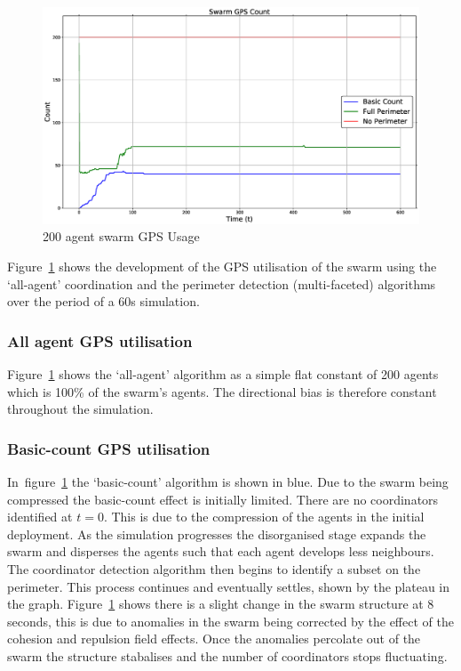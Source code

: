 \begin{figure}[H]
\begin{center}
\includegraphics[width=14cm]{CHAPTER-6/figures/SwarmPerimeter1}
\end{center}
\caption{200 agent swarm GPS Usage\label{fig:SwarmPerimeter1}}
\end{figure}

Figure~\ref{fig:SwarmPerimeter1} shows the development of the GPS utilisation of the swarm using the `all-agent' coordination and the perimeter detection (multi-faceted) algorithms over the period of a 60s simulation. 

\subsubsection{All agent GPS utilisation\label{section:SwarmPerimeter2}}
Figure~\ref{fig:SwarmPerimeter1} shows the `all-agent' algorithm as a simple flat constant of 200 agents which is 100\% of the swarm's agents. The directional bias is therefore constant throughout the simulation. 

\subsubsection{Basic-count GPS utilisation\label{section:SwarmPerimeter3}}
In~figure~\ref{fig:SwarmPerimeter1} the `basic-count' algorithm is shown in blue. Due to the swarm being compressed the basic-count effect is initially limited. There are no coordinators identified at $t=0$. This is due to the compression of the agents in the initial deployment. As the simulation progresses the disorganised stage expands the swarm and disperses the agents such that each agent develops less neighbours. The coordinator detection algorithm then begins to identify a subset on the perimeter. This process continues and eventually settles, shown by the plateau in the graph. Figure~\ref{fig:SwarmPerimeter1} shows there is a slight change in the swarm structure at 8 seconds, this is due to anomalies in the swarm being corrected by the effect of the cohesion and repulsion field effects. Once the anomalies percolate out of the swarm the structure stabalises and the number of coordinators stops fluctuating.

